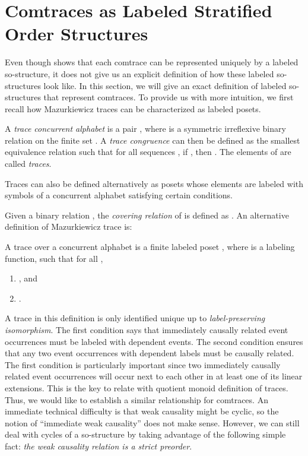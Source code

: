 \documentclass{llncs}
\begin{document}
\section{Comtraces as Labeled Stratified Order Structures \label{sec:lsos-comtrace}}
Even though  shows that each comtrace can be represented uniquely by a labeled so-structure, it does not give us an explicit definition of how these labeled so-structures look like. In this section, we will give an exact definition of labeled so-structures that represent comtraces. To provide us with more intuition, we first recall how Mazurkiewicz traces can be characterized as labeled posets.

A \emph{trace concurrent alphabet}  is  a pair , where
 is a symmetric irreflexive binary relation on the finite set . A \emph{trace congruence}  can then be defined as the smallest  equivalence relation such that for all sequences , if , then . The elements of  are called \emph{traces}.  

Traces can also be defined alternatively as posets whose elements are labeled with symbols of a concurrent alphabet  satisfying certain conditions.  

Given a binary relation , the \emph{covering relation} of  is defined as . An alternative definition of Mazurkiewicz trace is:


\begin{definition}[cf. \cite{TW02}] A trace over a concurrent alphabet  is a finite labeled poset , where  is a labeling function, such that for all ,
\begin{enumerate}
\item , and
\item . \EOD
\end{enumerate}
\label{def:ltraces}
\end{definition}

A trace in this definition is only identified unique up to  \emph{label-preserving isomorphism}. The first condition says that immediately causally related event occurrences  must be labeled with dependent events. The second condition ensures that any two event occurrences with dependent labels must be causally related.  The first condition is particularly important since two immediately causally related event occurrences will occur next to each other in at least one of its linear extensions. This is the key to relate   with quotient monoid definition of traces. Thus, we would like to establish a similar relationship for  comtraces. An immediate technical difficulty  is that weak causality might be cyclic, so the notion of ``immediate weak causality''  does not make sense. However, we can still deal with cycles of a so-structure by taking advantage of  the following simple fact: \emph{the weak causality relation is a strict preorder}.
\end{document}
